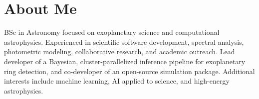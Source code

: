 \section*{About Me}
BSc in Astronomy focused on exoplanetary science and computational astrophysics. Experienced in scientific software development, spectral analysis, photometric modeling, collaborative research, and academic outreach. Lead developer of a Bayesian, cluster-parallelized inference pipeline for exoplanetary ring detection, and co-developer of an open-source simulation package. Additional interests include machine learning, AI applied to science, and high-energy astrophysics.
